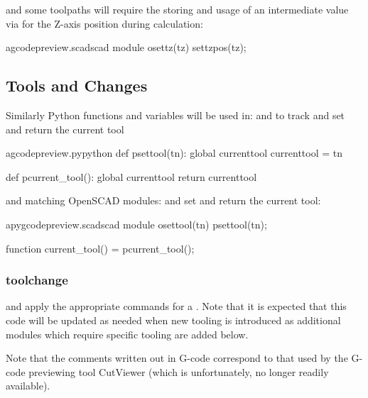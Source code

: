 \documentclass{ltxdoc}
\begin{document}
\noindent and some toolpaths will require the storing and usage of an intermediate value via
 for the Z-axis position during calculation:

\lstset{firstnumber=\thegcpscad}
\begin{writecode}{a}{gcodepreview.scad}{scad}
module osettz(tz) {
    settzpos(tz);
}

\end{writecode}
\addtocounter{gcpscad}{4}

\subsection{Tools and Changes}
 
Similarly Python functions and variables will be used in:  and
 to track and set and return the current tool
 
\lstset{firstnumber=\thegcpy}
\begin{writecode}{a}{gcodepreview.py}{python}
def psettool(tn):
    global currenttool
    currenttool = tn

def pcurrent_tool():
    global currenttool
    return currenttool

\end{writecode}
\addtocounter{gcpy}{8}
 
\noindent and matching OpenSCAD modules:
 and
set and return the current tool: 
  
\lstset{firstnumber=\thepyscad}
\begin{writecode}{a}{pygcodepreview.scad}{scad}
module osettool(tn){
    psettool(tn);
}

function current_tool() = pcurrent_tool();

\end{writecode}
\addtocounter{pyscad}{6}
 
\subsubsection{toolchange}
\noindent and apply the appropriate commands for a \label{subsubsec:toolchange}
. Note that it is expected that this code will be updated as needed 
when new tooling is introduced as additional modules which require specific tooling are added below.

Note that the comments written out in G-code correspond to that used by the G-code previewing tool 
CutViewer (which is unfortunately, no longer readily available).
\end{document}
